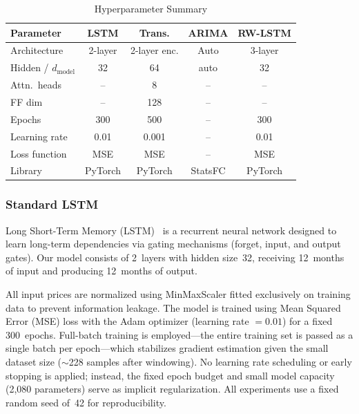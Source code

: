 \documentclass[journal]{IEEEtran}
\begin{document}
\begin{table}[htbp]
  \centering
  \caption{Hyperparameter Summary}
  \label{tab:hyperparams}
  \begin{tabular}{lcccc}
    \toprule
    \textbf{Parameter} & \textbf{LSTM} & \textbf{Trans.} & \textbf{ARIMA} & \textbf{RW-LSTM} \\
    \midrule
    Architecture & 2-layer & 2-layer enc. & Auto & 3-layer \\
    Hidden / $d_{\text{model}}$ & 32 & 64 & auto & 32 \\
    Attn.\ heads & -- & 8 & -- & -- \\
    FF dim & -- & 128 & -- & -- \\
    Epochs & 300 & 500 & -- & 300 \\
    Learning rate & 0.01 & 0.001 & -- & 0.01 \\
    Loss function & MSE & MSE & -- & MSE \\
    Library & PyTorch & PyTorch & StatsFC & PyTorch \\
    \bottomrule
  \end{tabular}
\end{table}

\subsubsection{Standard LSTM}

Long Short-Term Memory (LSTM)~\cite{hochreiter1997lstm} is a recurrent neural network designed to learn long-term dependencies via gating mechanisms (forget, input, and output gates). Our model consists of 2~layers with hidden size~32, receiving 12~months of input and producing 12~months of output.

All input prices are normalized using MinMaxScaler fitted exclusively on training data to prevent information leakage. The model is trained using Mean Squared Error (MSE) loss with the Adam optimizer (learning rate $= 0.01$) for a fixed 300~epochs. Full-batch training is employed---the entire training set is passed as a single batch per epoch---which stabilizes gradient estimation given the small dataset size ($\sim$228 samples after windowing). No learning rate scheduling or early stopping is applied; instead, the fixed epoch budget and small model capacity (2,080 parameters) serve as implicit regularization. All experiments use a fixed random seed of~42 for reproducibility.
\end{document}
